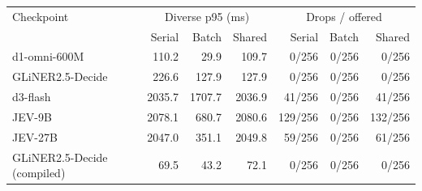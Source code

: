 \begin{tabular}{lrrrrrr}
\toprule
Checkpoint & \multicolumn{3}{c}{Diverse p95 (ms)} & \multicolumn{3}{c}{Drops / offered} \\
& Serial & Batch & Shared & Serial & Batch & Shared \\
\midrule
d1-omni-600M & 110.2 & 29.9 & 109.7 & 0/256 & 0/256 & 0/256 \\
GLiNER2.5-Decide & 226.6 & 127.9 & 127.9 & 0/256 & 0/256 & 0/256 \\
d3-flash & 2035.7 & 1707.7 & 2036.9 & 41/256 & 0/256 & 41/256 \\
JEV-9B & 2078.1 & 680.7 & 2080.6 & 129/256 & 0/256 & 132/256 \\
JEV-27B & 2047.0 & 351.1 & 2049.8 & 59/256 & 0/256 & 61/256 \\
GLiNER2.5-Decide (compiled) & 69.5 & 43.2 & 72.1 & 0/256 & 0/256 & 0/256 \\
\bottomrule
\end{tabular}
